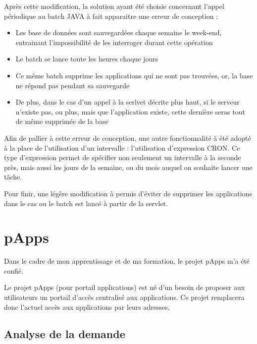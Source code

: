 \documentclass[12pt]{report}
\begin{document}
    Après cette modification, la solution ayant été choisie concernant l'appel périodique au batch JAVA à fait apparaitre une erreur de conception : 
    \begin{itemize}[itemsep=1pt, topsep=1pt]
        \item Les base de données sont sauvegardées chaque semaine le week-end, entrainant l'impossibilité de les interroger durant cette opération
        \item Le batch se lance toute les heures chaque jours
        \item Ce même batch supprime les applications qui ne sont pas trouvées, or, la base ne répond pas pendant sa sauvegarde
        \item De plus, dans le cas d'un appel à la serlvet décrite plus haut, si le serveur n'existe pas, ou plus, mais que l'application existe, cette dernière seras tout de même supprimée de la base
    \end{itemize}
    
    Afin de pallier à cette erreur de conception, une autre fonctionnalité à été adopté à la place de l'utilisation d'un intervalle : l'utilisation d'expression CRON. Ce type d'expression permet de spécifier non seulement un intervalle à la seconde près, mais aussi les jours de la semaine, ou du mois auquel on souhaite lancer une tâche.
    
    Pour finir, une légère modification à permis d'éviter de supprimer les applications dans le cas ou le batch est lancé à partir de la servlet.
    
    \section{pApps}
    \label{papps}
    Dans le cadre de mon apprentissage et de ma formation, le projet pApps m'a été confié.
    
    Le projet pApps (pour portail applications) est né d'un besoin de proposer aux utilisateurs un portail d'accès centralisé aux applications. Ce projet remplacera donc l'actuel accès aux applications par leurs adresses.
    
    \newpage
    
    \subsection{Analyse de la demande}
\end{document}

